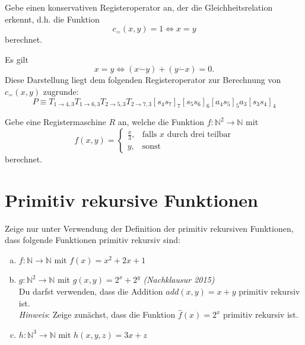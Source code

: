 \documentclass[german,headsepline]{scrartcl}
\begin{document}
	\begin{question}[subtitle={Nachklausur 2015}]
		Gebe einen konservativen Registeroperator an,
		der die Gleichheitsrelation erkennt, d.h. die Funktion
		\[c_=(x,y)=1\Leftrightarrow x=y\]
		berechnet.
	\end{question}
	\begin{solution}
		Es gilt
		\[x=y\Leftrightarrow (x\dot{-}y)+(y\dot{-}x)=0.\]
		Diese Darstellung liegt dem folgenden Registeroperator zur Berechnung von $c_=(x,y)$ zugrunde:
		\[P\equiv T_{1\to4,3}T_{1\to6,3}T_{2\to5,3}T_{2\to7,3}[s_4s_7]_7[s_5s_6]_6[a_4s_5]_5a_3[s_3s_4]_4\]
	\end{solution}
	
	\begin{question}[subtitle={Blatt 13, 2015}]
		Gebe eine Registermaschine $R$ an, welche die Funktion $f:\mathbb{N}^2\to\mathbb{N}$ mit
		\[f(x,y)=\begin{cases}
			\frac{x}{3}, &\text{falls $x$ durch drei teilbar} \\
			y, &\text{sonst}
		\end{cases}\]
		berechnet.
	\end{question}
	
	\section{Primitiv rekursive Funktionen}
	\begin{question}
		Zeige nur unter Verwendung der Definition der primitiv rekursiven Funktionen,
		dass folgende Funktionen primitiv rekursiv sind:
		\begin{enumerate}[(a)]
			\item $f:\mathbb{N}\to\mathbb{N}$ mit $f(x)=x^2+2x+1$
			\item $g:\mathbb{N}^2\to\mathbb{N}$ mit $g(x,y)=2^x+2^y$
				\hfill\textit{(Nachklausur 2015)} \\
				Du darfst verwenden, dass die Addition $add(x,y)=x+y$ primitiv rekursiv ist. \\
				\textit{Hinweis}: Zeige zunächst, dass die Funktion $\hat{f}(x)=2^x$ primitiv rekursiv ist.
			\item $h:\mathbb{N}^3\to\mathbb{N}$ mit $h(x,y,z)=3x+z$
		\end{enumerate}
	\end{question}
	
\end{document}
